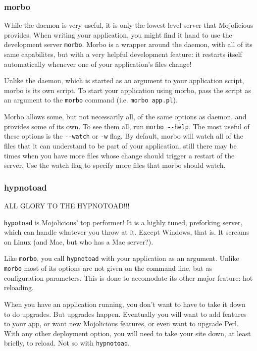 \subsubsection{morbo}

While the daemon is very useful, it is only the lowest level server that Mojolicious provides.
When writing your application, you might find it hand to use the development server \verb!morbo!.
Morbo is a wrapper around the daemon, with all of its same capabilites, but with a very helpful development feature:
it restarts itself automatically whenever one of your application's files change!

Unlike the daemon, which is started as an argument to your application script, morbo is its own script.
To start your application using morbo, pass the script as an argument to the \verb!morbo! command (i.e. \verb!morbo app.pl!).

Morbo allows some, but not necessarily all, of the same options as daemon, and provides some of its own.
To see them all, run \verb!morbo --help!.
The most useful of these options is the \verb!--watch! or \verb!-w! flag.
By default, morbo will watch all of the files that it can understand to be part of your application,
still there may be times when you have more files whose change should trigger a restart of the server.
Use the watch flag to specify more files that morbo should watch.

\subsubsection{hypnotoad}

ALL GLORY TO THE HYPNOTOAD!!!

\verb!hypotoad! is Mojolicious' top performer!
It is a highly tuned, preforking server, which can handle whatever you throw at it.
Except Windows, that is.
It screams on Linux (and Mac, but who has a Mac server?).

Like \verb!morbo!, you call \verb!hypnotoad! with your application as an argument.
Unlike \verb!morbo! most of its options are not given on the command line, but as configuration parameters.
This is done to accomodate its other major feature: hot reloading.

When you have an application running, you don't want to have to take it down to do upgrades.
But upgrades happen.
Eventually you will want to add features to your app, or want new Mojolicious features, or even want to upgrade Perl.
With any other deployment option, you will need to take your site down, at least briefly, to reload.
Not so with \verb!hypnotoad!.

